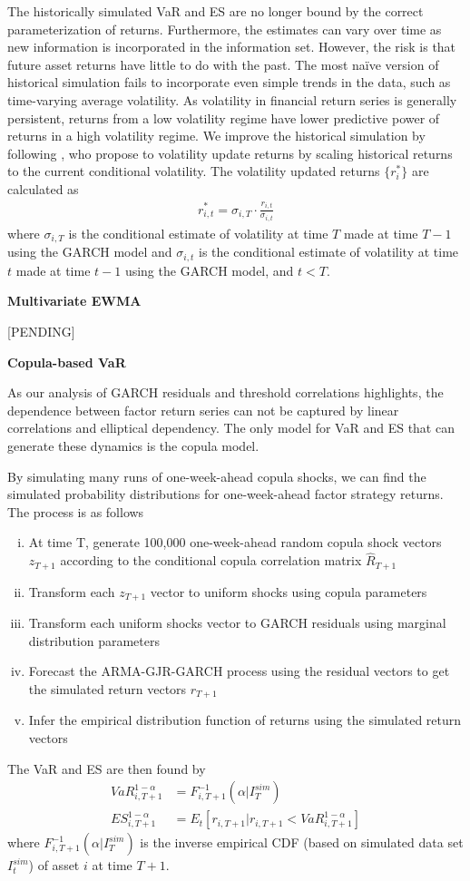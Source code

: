 The historically simulated VaR and ES are no longer bound by the correct parameterization of returns. Furthermore, the estimates can vary over time as new information is incorporated in the information set. However, the risk is that future asset returns have little to do with the past. The most naïve version of historical simulation fails to incorporate even simple trends in the data, such as time-varying average volatility. As volatility in financial return series is generally persistent, returns from a low volatility regime have lower predictive power of returns in a high volatility regime. We improve the historical simulation by following \textcite{HullWhite1998}, who propose to volatility update returns by scaling historical returns to the current conditional volatility. The volatility updated returns $\{r^*_i\}$ are calculated as
\begin{align}
    r^*_{i, t} = \sigma_{i,T} \cdot \frac{r_{i,t}}{\sigma_{i,t}}
\end{align}
where $\sigma_{i,T}$ is the conditional estimate of volatility at time $T$ made at time $T-1$ using the GARCH model and $\sigma_{i,t}$ is the conditional estimate of volatility at time $t$ made at time $t-1$ using the GARCH model, and $t<T$.

\textbf{Multivariate EWMA}

[PENDING]

\textbf{Copula-based VaR}

As our analysis of GARCH residuals and threshold correlations highlights, the dependence between factor return series can not be captured by linear correlations and elliptical dependency. The only model for VaR and ES that can generate these dynamics is the copula model.

By simulating many runs of one-week-ahead copula shocks, we can find the simulated probability distributions for one-week-ahead factor strategy returns. The process is as follows
\begin{enumerate}[(i)]
    \item At time T, generate 100,000 one-week-ahead random copula shock vectors $z_{T+1}$ according to the conditional copula correlation matrix $\hat{R}_{T+1}$
    \item Transform each $z_{T+1}$ vector to uniform shocks using copula parameters
    \item Transform each uniform shocks vector to GARCH residuals using marginal distribution parameters
    \item Forecast the ARMA-GJR-GARCH process using the residual vectors to get the simulated return vectors $r_{T+1}$
    \item Infer the empirical distribution function of returns using the simulated return vectors
\end{enumerate}
The VaR and ES are then found by
\begin{align}
    VaR_{i,T+1}^{1-\alpha} &= F_{i, T+1}^{-1}(\alpha | I^{sim}_T) \\
    ES_{i, T+1}^{1 - \alpha} &= E_t[r_{i,T+1} | r_{i,T+1} < VaR_{i,T+1}^{1-\alpha}]
\end{align}
where $F_{i, T+1}^{-1}(\alpha | I^{sim}_T)$ is the inverse empirical CDF (based on simulated data set $I^{sim}_t$) of asset $i$ at time $T+1$.

